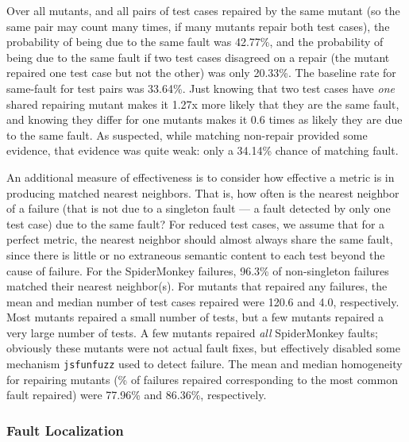 Over all mutants, and all pairs of test cases repaired by the same mutant (so the same pair may count many times, if many mutants repair both test cases), the probability of being due to the same fault was 42.77\%, and the probability of being due to the same fault if two test cases disagreed on a repair (the mutant repaired one test case but not the other) was only 20.33\%.  The baseline rate for same-fault for test pairs was 33.64\%.  Just knowing that two test cases have \emph{one} shared repairing mutant makes it 1.27x more likely that they are the same fault, and knowing they differ for one mutants makes it 0.6 times as likely they are due to the same fault.  As suspected, while matching non-repair provided some evidence, that evidence was quite weak:  only a 34.14\% chance of matching fault.

An additional measure of effectiveness is to consider how effective a metric is in producing matched nearest neighbors.  That is, how often is the nearest neighbor of a failure (that is not due to a singleton fault --- a fault detected by only one test case) due to the same fault?  For reduced \cite{DD,PLDI13,
CReduce} test cases, we assume that for a perfect metric, the nearest neighbor should almost always share the same fault, since there is little or no extraneous semantic content to each test beyond the cause of failure.  For the SpiderMonkey failures, 96.3\% of non-singleton failures matched their nearest neighbor(s).  For mutants that repaired any failures, the mean and median number of test cases repaired were 120.6 and 4.0, respectively.  Most mutants repaired a small number of tests, but a few mutants repaired a very large number of tests.  A few mutants repaired \emph{all} SpiderMonkey faults; obviously these mutants were not actual fault fixes, but effectively disabled some mechanism {\tt jsfunfuzz} used to detect failure. The mean and median homogeneity for repairing mutants (\% of failures repaired corresponding to the most common fault repaired) were 77.96\% and 86.36\%, respectively.  

\subsubsection{Fault Localization}

